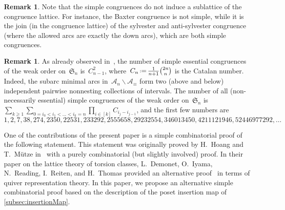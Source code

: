 \documentclass{amsart}
\theoremstyle{definition}
\newtheorem{remark}[theorem]{Remark}
\newcommand{\f}[1]{{\mathfrak{#1}}} %
\newcommand{\ssm}{\smallsetminus} %
\newcommand{\eqdef}{\mbox{\,\raisebox{0.2ex}{\scriptsize\ensuremath{\mathrm:}}\ensuremath{=}\,}} %
\newcommand{\arcs}{{\mathcal{A}}} %
\begin{document}
\begin{remark}
Note that the simple congruences do not induce a sublattice of the congruence lattice.
For instance, the Baxter congruence is not simple, while it is the join (in the congruence lattice) of the sylvester and anti-sylvester congruence (where the allowed arcs are exactly the down arcs), which are both simple congruences.
\end{remark}

\begin{remark}
As already observed in~\cite[Sect.~4.4]{HoangMutze}, the number of simple essential congruences of the weak order on~$\f{S}_n$ is~$C_{n-1}^2$, where~$C_n \eqdef \frac{1}{n+1} \binom{2n}{n}$ is the Catalan number.
Indeed, the subarc minimal arcs in~$\arcs_n \ssm \arcs_\equiv$ form two (above and below) independent pairwise nonnesting collections of intervals.
The number of all (non-necessarily essential) simple congruences of the weak order on~$\f{S}_n$ is~$\sum_{k \ge 1} \sum_{0 = i_0 < i_1 < \dots < i_k = n} \prod_{i \in [k]} C_{i_j - i_{j-1}}$, and the first few numbers are
\[
1, 2, 7, 38, 274, 2350, 22531, 233292, 2555658, 29232554, 346013450, 4211121946, 52446977292, \dots
\]
\end{remark}

One of the contributions of the present paper is a simple combinatorial proof of the following statement.
This statement was originally proved by H.~Hoang and T.~Mütze in~\cite[Sect.~4.4]{HoangMutze} with a purely combinatorial (but slightly involved) proof.
In their paper on the lattice theory of torsion classes, L.~Demonet, O.~Iyama, N.~Reading, I.~Reiten, and H.~Thomas provided an alternative proof~\cite[Sect.~6.3]{DemonetIyamaReadingReitenThomas} in terms of quiver representation theory.
In this paper, we propose an alternative simple combinatorial proof based on the description of the poset insertion map of \cref{subsec:insertionMap}.
\end{document}
